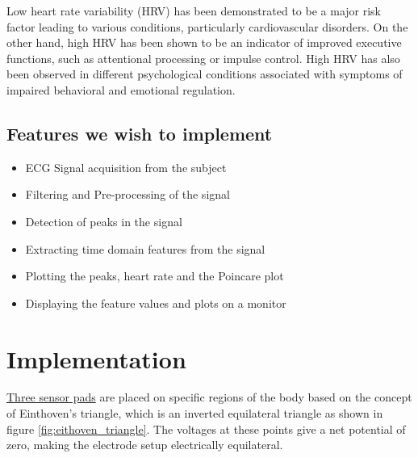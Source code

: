 \documentclass[11pt]{article}
\theoremstyle{definition}
\begin{document}
Low heart rate variability (HRV) has been demonstrated to be a major risk factor leading to various conditions, particularly cardiovascular disorders\cite{kamath1987heart}.
  On the other hand, high HRV has been shown to be an indicator of improved executive functions, such as attentional processing or impulse control\cite{appelhans2006heart, thayer2005psychosomatics}.
  High HRV has also been observed in different psychological conditions associated with symptoms of impaired behavioral and emotional regulation\cite{thayer2009claude, schulz2008negative}.


  \subsection{Features we wish to implement}
  \begin{itemize}
  \item ECG Signal acquisition from the subject
  \item Filtering and Pre-processing of the signal
  \item Detection of peaks in the signal
  \item Extracting time domain features from the signal
  \item Plotting the peaks, heart rate and the Poincare plot
  \item Displaying the feature values and plots on a monitor
  \end{itemize}


  \newpage
  \section{Implementation}
  \underline{Three sensor pads} are placed on specific regions of the body based on the concept of Einthoven’s triangle\cite{abi2019einthoven}, which is an inverted equilateral triangle as shown in figure \ref{fig:eithoven_triangle}. The voltages at these points give a net potential of zero, making the electrode setup electrically equilateral.
\end{document}
